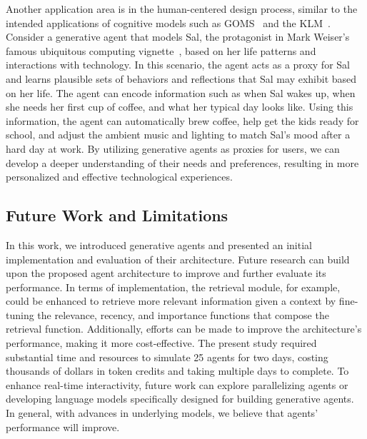 Another application area is in the human-centered design process, similar to the intended applications of cognitive models such as GOMS~\cite{john1996goms} and the KLM~\cite{card1980keystroke}. Consider a generative agent that models Sal, the protagonist in Mark Weiser's famous ubiquitous computing vignette~\cite{weiser1991computer}, based on her life patterns and interactions with technology. In this scenario, the agent acts as a proxy for Sal and learns plausible sets of behaviors and reflections that Sal may exhibit based on her life. The agent can encode information such as when Sal wakes up, when she needs her first cup of coffee, and what her typical day looks like. Using this information, the agent can automatically brew coffee, help get the kids ready for school, and adjust the ambient music and lighting to match Sal's mood after a hard day at work. By utilizing generative agents as proxies for users, we can develop a deeper understanding of their needs and preferences, resulting in more personalized and effective technological experiences.

\subsection{Future Work and Limitations} In this work, we introduced generative agents and presented an initial implementation and evaluation of their architecture. Future research can build upon the proposed agent architecture to improve and further evaluate its performance. In terms of implementation, the retrieval module, for example, could be enhanced to retrieve more relevant information given a context by fine-tuning the relevance, recency, and importance functions that compose the retrieval function. Additionally, efforts can be made to improve the architecture's performance, making it more cost-effective. The present study required substantial time and resources to simulate 25 agents for two days, costing thousands of dollars in token credits and taking multiple days to complete. To enhance real-time interactivity, future work can explore parallelizing agents or developing language models specifically designed for building generative agents. In general, with advances in underlying models, we believe that agents' performance will improve.

